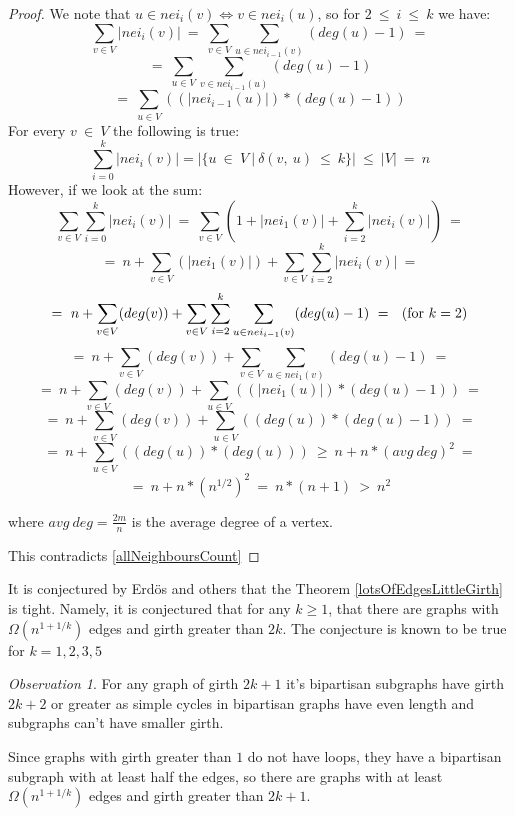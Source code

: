 \documentclass[shortabstract, lic, english]{iithesis}
\theoremstyle{definition} \newtheorem{definition}{Definition}[chapter]
\theoremstyle{remark} \newtheorem{remark}[definition]{Observation}
\theoremstyle{plain} \newtheorem{theorem}[definition]{Theorem}
\theoremstyle{plain} \newtheorem{lemma}[definition]{Lemma}
\theoremstyle{plain} \newtheorem{conjecture}[definition]{Conjecture}
\begin{document}
\begin{proof}
    \newpage

    We note that $u\in nei_i(v) \iff v\in nei_i(u)$, so for $2~\leq~i~\leq~k$ we have:
    $$\sum_{v \in V}|nei_i(v)|~=
    ~\sum_{v \in V}\sum_{u \in nei_{i-1}(v)} (deg(u) - 1)~=$$
    $$=~\sum_{u \in V}\sum_{v \in nei_{i-1}(u)}(deg(u) - 1)$$
    $$=~\sum_{u \in V}((|nei_{i-1}(u)|)*(deg(u) - 1))$$
    For every $v~\in~V$ the following is true:
    \begin{equation}\label{allNeighboursCount}
    \sum_{i=0}^{k} |nei_i(v)|=|\{u~\in~V~|~\delta(v,~u)~\leq~k\}|~\leq~|V|~=~n
    \end{equation}
    However, if we look at the sum:
    $$\sum_{v \in V}\sum_{i=0}^{k} |nei_i(v)|~=
    ~\sum_{v \in V}(1 + |nei_1(v)| + \sum_{i=2}^{k} |nei_i(v)|)~=$$
    $$=~n+\sum_{v \in V}(|nei_1(v)|)+\sum_{v \in V}\sum_{i=2}^{k} |nei_i(v)|~=$$
    $$=~n+\sum_{v \in V}(deg(v))+\sum_{v \in V}\sum_{i=2}^{k}\sum_{u \in nei_{i-1}(v)} (deg(u) - 1)~=~~(\textnormal{for}~k=2)$$
    $$=~n+\sum_{v \in V}(deg(v))+\sum_{v \in V}\sum_{u \in nei_1(v)} (deg(u) -1)~=$$
    $$=~n+\sum_{v \in V}(deg(v))+\sum_{u \in V}((|nei_1(u)|)*(deg(u) -1))~=$$
    $$=~n+\sum_{v \in V}(deg(v))+\sum_{u \in V}((deg(u))*(deg(u) -1))~=$$
    $$=~n+\sum_{u \in V}((deg(u))*(deg(u)))~\geq~n+n*(avg~deg)^2~=$$
    $$=~n+n*(n^{1/2})^2~=~n*(n+1)~>~n^2$$

    where $avg~deg = \frac{2m}{n}$ is the average degree of a vertex.

    This contradicts \ref{allNeighboursCount}
\end{proof}

It is conjectured by Erd{\"o}s \cite{erdos1963} and others that the Theorem \ref{lotsOfEdgesLittleGirth} is tight.
Namely, it is conjectured that for any $k\geq1$, that there are graphs with
$\Omega(n^{1 + 1/k})$ edges and girth greater than $2k$. The conjecture is known to be true for $k=1,2,3,5$

\begin{remark}
For any graph of girth $2k+1$ it's bipartisan subgraphs have girth $2k+2$ or greater as simple cycles in bipartisan graphs have even length and subgraphs can't have smaller girth.
\end{remark}

Since graphs with girth greater than $1$ do not have loops, they have a bipartisan subgraph with at least half the edges, so
there are graphs with at least $\Omega(n^{1 + 1/k})$ edges and girth greater than $2k+1$.
\end{document}
